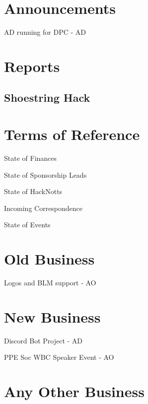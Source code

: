 \documentclass[11pt,hacksoc,agenda]{meetingmins}
\begin{document}
\maketitle

\section{Announcements}
\begin{items}
\item AD running for DPC - AD
\end{items}

\section{Reports}
\subsection{Shoestring Hack}

\section{Terms of Reference}
\begin{items}
\item {State of Finances}
\item {State of Sponsorship Leads}
\item {State of HackNotts}
\item {Incoming Correspondence}
\item {State of Events}
\end{items}

\section{Old Business}
\begin{items}
\item Logos and BLM support - AO
\end{items}

\section{New Business}
\begin{items}
\item Discord Bot Project - AD
\item PPE Soc WBC Speaker Event - AO
\end{items}

\section{Any Other Business}

\vspace{1em}
\end{document}

